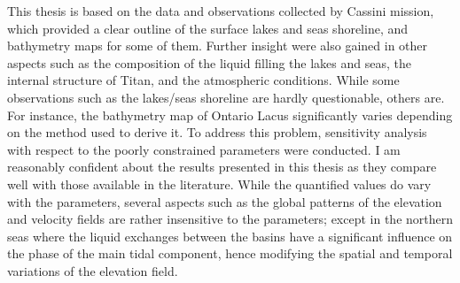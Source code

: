 This thesis is based on the data and observations collected by Cassini mission, which provided a clear outline of the surface lakes and seas shoreline, and bathymetry maps for some of them. Further insight were also gained in other aspects such as the composition of the liquid filling the lakes and seas, the internal structure of Titan, and the atmospheric conditions. While some observations such as the lakes/seas shoreline are hardly questionable, others are. For instance, the bathymetry map of Ontario Lacus significantly varies depending on the method used to derive it. To address this problem, sensitivity analysis with respect to the poorly constrained parameters were conducted. I am reasonably confident about the results presented in this thesis as they compare well with those available in the literature. While the quantified values do vary with the parameters, several aspects such as the global patterns of the elevation and velocity fields are rather insensitive to the parameters; except in the northern seas where the liquid exchanges between the basins have a significant influence on the phase of the main tidal component, hence modifying the spatial and temporal variations of the elevation field.
 
